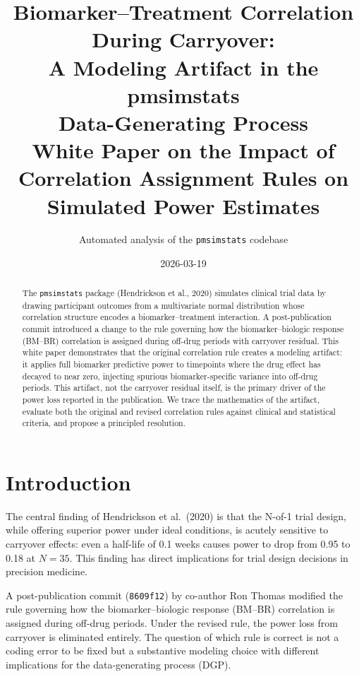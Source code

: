 \documentclass[11pt]{article}
\title{Biomarker--Treatment Correlation During Carryover:\\
       A Modeling Artifact in the pmsimstats\\
       Data-Generating Process\\[6pt]
       \large White Paper on the Impact of Correlation
       Assignment Rules on Simulated Power Estimates}
\author{Automated analysis of the \texttt{pmsimstats} codebase}
\date{2026-03-19}
\begin{document}
\maketitle
\thispagestyle{fancy}

\begin{abstract}
The \texttt{pmsimstats} package (Hendrickson et al., 2020)
simulates clinical trial data by drawing participant outcomes
from a multivariate normal distribution whose correlation
structure encodes a biomarker--treatment interaction. A
post-publication commit introduced a change to the rule
governing how the biomarker--biologic response (BM--BR)
correlation is assigned during off-drug periods with carryover
residual. This white paper demonstrates that the original
correlation rule creates a modeling artifact: it applies full
biomarker predictive power to timepoints where the drug effect
has decayed to near zero, injecting spurious biomarker-specific
variance into off-drug periods. This artifact, not the carryover
residual itself, is the primary driver of the power loss reported
in the publication. We trace the mathematics of the artifact,
evaluate both the original and revised correlation rules against
clinical and statistical criteria, and propose a principled
resolution.
\end{abstract}

\tableofcontents
\newpage

\section{Introduction}

The central finding of Hendrickson et al.\ (2020) is that the
N-of-1 trial design, while offering superior power under ideal
conditions, is acutely sensitive to carryover effects: even a
half-life of 0.1 weeks causes power to drop from 0.95 to 0.18
at $N = 35$. This finding has direct implications for trial
design decisions in precision medicine.

A post-publication commit (\texttt{8609f12}) by co-author Ron
Thomas modified the rule governing how the biomarker--biologic
response (BM--BR) correlation is assigned during off-drug
periods. Under the revised rule, the power loss from carryover
is eliminated entirely. The question of which rule is correct
is not a coding error to be fixed but a substantive modeling
choice with different implications for the data-generating
process (DGP).
\end{document}
